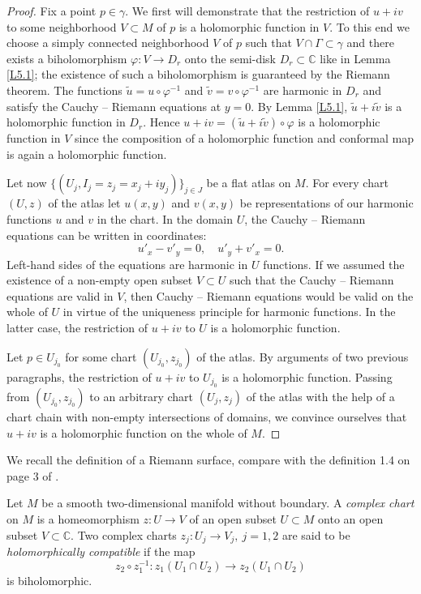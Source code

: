 \documentclass[12pt,reqno]{amsart}
\begin{document}
\begin{proof}
Fix a point $p\in\gamma$. We first will demonstrate that the restriction of $u+iv$ to some neighborhood $V\subset M$ of $p$ is a holomorphic function in $V$. To this end we choose a simply connected neighborhood $V$ of $p$ such that $V\cap\Gamma\subset\gamma$ and there exists a biholomorphism $\varphi:V\to D_r$ onto the semi-disk $D_r\subset{\mathbb C}$ like in Lemma \ref{L5.1}; the existence of such a biholomorphism is guaranteed by the Riemann theorem. The functions $\tilde u=u\circ\varphi^{-1}$ and $\tilde v=v\circ\varphi^{-1}$ are harmonic in $D_r$ and satisfy the Cauchy -- Riemann equations at $y=0$. By Lemma \ref{L5.1}, $\tilde u+i\tilde v$ is a holomorphic function in $D_r$. Hence  $u+iv=(\tilde u+i\tilde v)\circ\varphi$ is a holomorphic function in $V$ since the composition of a holomorphic function and conformal map is again a holomorphic function.

Let now $\{(U_j,I_j=z_j=x_j+iy_j)\}_{j\in J}$ be a flat atlas on $M$. For every chart $(U,z)$ of the atlas let $u(x,y)$ and $v(x,y)$ be representations of our harmonic functions $u$ and $v$ in the chart. In the domain $U$, the Cauchy -- Riemann equations can be written in coordinates:
$$
u'_x-v'_y=0,\quad u'_y+v'_x=0.
$$
Left-hand sides of the equations are harmonic in $U$ functions. If we assumed the existence of a non-empty open subset
$V\subset U$ such that the Cauchy -- Riemann equations are valid in $V$, then Cauchy -- Riemann equations would be valid on the whole of $U$ in virtue of the uniqueness principle for harmonic functions. In the latter case, the restriction of $u+iv$ to $U$ is a holomorphic function.

Let $p\in U_{j_0}$ for some chart $(U_{j_0},z_{j_0})$ of the atlas. By arguments of two previous paragraphs, the restriction of $u+iv$ to $U_{j_0}$ is a holomorphic function. Passing from $(U_{j_0},z_{j_0})$ to an arbitrary chart $(U_j,z_j)$ of the atlas with the help of a chart chain with non-empty intersections of domains, we convince ourselves that $u+iv$ is a holomorphic function on the whole of $M$.
\end{proof}

We recall the definition of a Riemann surface, compare with the definition 1.4 on page 3 of \cite{F}.

Let $M$ be a smooth two-dimensional manifold without boundary.
A {\it complex chart} on $M$ is a homeomorphism $ z:U\to V$ of an open subset $U\subset M$ onto an open subset $V\subset{\mathbb C}$.
Two complex charts $ z_j:U_j\to V_j,\ j=1,2$ are said to be {\it holomorphically compatible} if the map
\begin{equation}
 z_2\circ z_1^{-1}: z_1(U_1\cap U_2)\to z_2(U_1\cap U_2)
                                \label{5.3}
\end{equation}
is biholomorphic.
\end{document}
